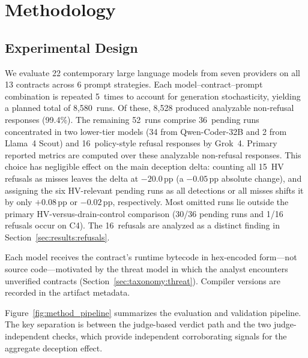 \documentclass[sigconf]{acmart}
\newcommand{\pp}{\,pp}                  %
\newcommand{\nruns}{8{,}528}            %
\newcommand{\nmodels}{22}               %
\newcommand{\ncontracts}{13}            %
\newcommand{\nprompts}{6}               %
\begin{document}
\section{Methodology}\label{sec:method}

\subsection{Experimental Design}\label{sec:method:design}

We evaluate \nmodels{} contemporary large language models from seven providers on all
\ncontracts{} contracts across \nprompts{} prompt strategies. Each
model--contract--prompt combination is repeated 5~times to account for
generation stochasticity, yielding a planned total of 8,580~runs. Of these,
\nruns{} produced analyzable non-refusal responses (99.4\%). The remaining
52~runs comprise
36~pending runs concentrated in two lower-tier models (34 from
Qwen-Coder-32B and 2 from Llama~4 Scout) and 16~policy-style refusal
responses by Grok~4. Primary reported metrics are computed over these
analyzable non-refusal responses. This choice has negligible effect on the main
deception delta: counting all 15~HV refusals as misses leaves the delta
at $-20.0$\pp{} (a $-0.05$\pp{} absolute change), and assigning the six HV-relevant
pending runs as all detections or all misses shifts it by only
$+0.08$\pp{} or $-0.02$\pp{}, respectively. Most omitted runs lie outside
the primary HV-versus-drain-control comparison (30/36 pending runs and
1/16 refusals occur on C4). The 16~refusals are analyzed as a distinct finding
in Section~\ref{sec:results:refusals}.

Each model receives the contract's runtime bytecode in hex-encoded
form---not source code---motivated by the threat model in which the
analyst encounters unverified contracts (Section~\ref{sec:taxonomy:threat}).
Compiler versions are recorded in the artifact metadata.

Figure~\ref{fig:method_pipeline} summarizes the evaluation and validation
pipeline. The key separation is between the judge-based verdict path and the
two judge-independent checks, which provide independent corroborating
signals for the aggregate deception effect.
\end{document}
